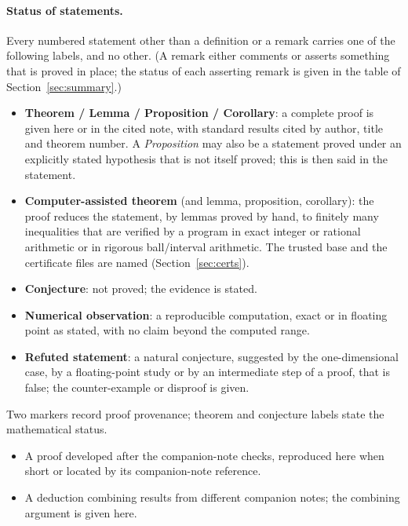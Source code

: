 \documentclass[10pt,a4paper]{article}
\theoremstyle{plain}
\theoremstyle{definition}
\newcommand{\NEW}{\ensuremath{^{\dagger}}}       %
\newcommand{\SYN}{\ensuremath{^{\ddagger}}}      %
\begin{document}
\paragraph{Status of statements.} Every numbered statement other than a definition or a remark carries one of the following labels, and no other. (A remark either comments or asserts something that is proved in place; the status of each asserting remark is given in the table of Section~\ref{sec:summary}.)
\begin{itemize}
\item \textbf{Theorem / Lemma / Proposition / Corollary}: a complete proof is given here or in the cited note, with standard results cited by author, title and theorem number. A \emph{Proposition} may also be a statement proved under an explicitly stated hypothesis that is not itself proved; this is then said in the statement.
\item \textbf{Computer-assisted theorem} (and lemma, proposition, corollary): the proof reduces the statement, by lemmas proved by hand, to finitely many inequalities that are verified by a program in exact integer or rational arithmetic or in rigorous ball/interval arithmetic. The trusted base and the certificate files are named (Section~\ref{sec:certs}).
\item \textbf{Conjecture}: not proved; the evidence is stated.
\item \textbf{Numerical observation}: a reproducible computation, exact or in floating point as stated, with no claim beyond the computed range.
\item \textbf{Refuted statement}: a natural conjecture, suggested by the one-dimensional case, by a floating-point study or by an intermediate step of a proof, that is false; the counter-example or disproof is given.
\end{itemize}
Two markers record proof provenance; theorem and conjecture labels state the mathematical status.
\begin{itemize}
\item[\NEW] A proof developed after the companion-note checks, reproduced here when short or located by its companion-note reference.
\item[\SYN] A deduction combining results from different companion notes; the combining argument is given here.
\end{itemize}
\end{document}
